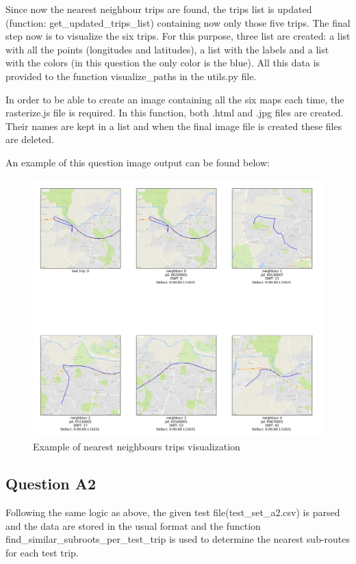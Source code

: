 \documentclass[12pt]{article}
\begin{document}
	Since now the nearest neighbour trips are found, the trips list is updated (function: get\_updated\_trips\_list) containing now only those five trips. The final step now is to visualize the six trips. For this purpose, three list are created: a list with all the points (longitudes and latitudes), a list with the labels and a list with the colors (in this question the only color is the blue). All this data is provided to the function visualize\_paths in the utils.py file.
	
	In order to be able to create an image containing all the six maps each time, the rasterize.js file is required. In this function, both .html and .jpg files are created. Their names are kept in a list and when the final image file is created these files are deleted. 
	
	An example of this question image output can be found below:
	
	\begin{figure} [H]
		\begin{center}
			\includegraphics [scale = 0.50] {question2a1example.jpg}
			\caption{Example of nearest neighbours trips visualization}
		\end{center}
	\end{figure} 
	
	\subsection{Question A2}
	Following the same logic as above, the given test file(test\_set\_a2.csv) is parsed and the data are stored in the usual format and the function find\_similar\_subroots\_per\_test\_trip is used to determine the nearest sub-routes for each test trip.
	
\end{document}

